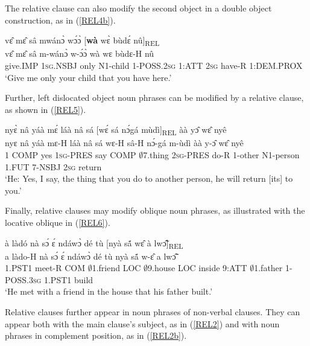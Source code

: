 \noindent The relative clause can also modify the second object in a double object construction, as in (\ref{REL4b}).

\begin{exe} 
\ex\label{REL4b} 
  \glll  vɛ̂ mɛ̂ sâ mwánɔ̀ wɔ́ɔ̀ [{\bfseries wà} wɛ̀ bùdɛ́ nû]\textsubscript{REL} \\
         vɛ̂ mɛ̂ sâ m-wánɔ̀ w-ɔ́ɔ̀ wà wɛ bùdɛ-H nû \\
          give.IMP 1\textsc{sg}.NSBJ only N1-child 1-POSS.2\textsc{sg} 1:ATT 2\textsc{sg} have-R 1:DEM.PROX \\
    \trans `Give me only your child that you have here.'
\end{exe}


Further, left dislocated object noun phrases can be modified by a relative clause, as shown in (\ref{REL5}).

\begin{exe} 
\ex\label{REL5}
  \glll nyɛ̀ nâ yáà mɛ́ láà nâ sá [wɛ́ sá nɔ́gá mùdì]\textsubscript{REL} àà yɔ̂ wɛ̂ nyê \\
      nyɛ nâ yáà mɛ-H láà nâ sá wɛ-H sâ-H nɔ́-gá m-ùdì àà y-ɔ̂ wɛ̂ nyê\\
        1 COMP yes 1\textsc{sg}-PRES say COMP $\emptyset$7.thing 2\textsc{sg}-PRES do-R 1-other N1-person 1.FUT 7-NSBJ 2\textsc{sg} return\\
    \trans `He: Yes, I say, the thing that you do to another person, he will return [its] to you.'
\end{exe}

\noindent Finally, relative clauses may modify oblique noun phrases, as illustrated with the locative oblique in (\ref{REL6}).

\begin{exe} 
\ex\label{REL6}
  \glll à làdó nà sɔ́ ɛ́ ndáwɔ̀ dé tù [nyà sã́ wɛ̂ à lwɔ̃̂]\textsubscript{REL} \\
      a làdo-H nà sɔ́ ɛ́ ndáwɔ̀ dé tù nyà sã́ w-ɛ̂ a lwɔ̃̂\\
      1.PST1 meet-R COM $\emptyset$1.friend LOC $\emptyset$9.house LOC inside 9:ATT $\emptyset$1.father 1-POSS.3\textsc{sg} 1.PST1 build  \\
    \trans `He met with a friend in the house that his father built.'
\end{exe}

Relative clauses further appear in noun phrases of non-verbal clauses. They can appear both with the main clause's subject, as in (\ref{REL2}) and with noun phrases in complement position, as in (\ref{REL2b}).

